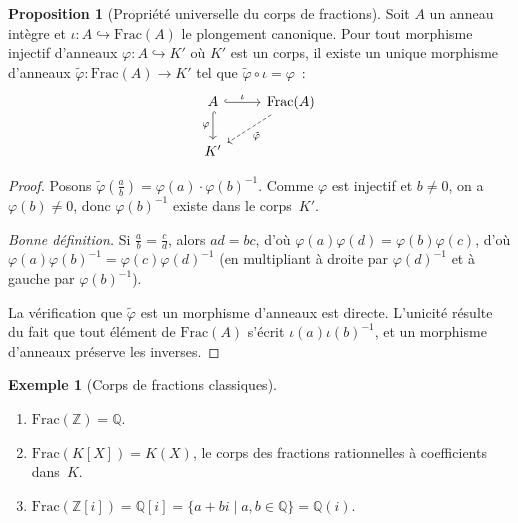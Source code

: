 \documentclass[12pt,a4paper,openany]{book}
\theoremstyle{definition}
\newtheorem{proposition}{Proposition}[chapter]
\newtheorem{exemple}{Exemple}[chapter]
\newcommand{\Z}{\mathbb{Z}}
\newcommand{\Q}{\mathbb{Q}}
\begin{document}
\begin{proposition}[Propriété universelle du corps de fractions]%
\label{prop:prop-univ-fractions}
Soit $A$ un anneau intègre et $\iota \colon A \hookrightarrow
\mathrm{Frac}(A)$ le plongement canonique. Pour tout morphisme
injectif d'anneaux $\varphi \colon A \hookrightarrow K'$ où $K'$ est
un corps, il existe un unique morphisme d'anneaux
$\tilde{\varphi} \colon \mathrm{Frac}(A) \to K'$ tel que
$\tilde{\varphi} \circ \iota = \varphi$~:
\[
\begin{tikzcd}
  A \arrow[r, hook, "\iota"] \arrow[d, hook, "\varphi"'] &
  \mathrm{Frac}(A) \arrow[dl, dashed, "\tilde{\varphi}"] \\
  K'
\end{tikzcd}
\]
\end{proposition}

\begin{proof}
Posons $\tilde{\varphi}\!\left(\frac{a}{b}\right) =
\varphi(a) \cdot \varphi(b)^{-1}$. Comme $\varphi$ est injectif et
$b \neq 0$, on a $\varphi(b) \neq 0$, donc $\varphi(b)^{-1}$ existe
dans le corps~$K'$.

\emph{Bonne définition.} Si $\frac{a}{b} = \frac{c}{d}$, alors
$ad = bc$, d'où $\varphi(a)\varphi(d) = \varphi(b)\varphi(c)$, d'où
$\varphi(a)\varphi(b)^{-1} = \varphi(c)\varphi(d)^{-1}$ (en multipliant
à droite par $\varphi(d)^{-1}$ et à gauche par $\varphi(b)^{-1}$).

La vérification que $\tilde{\varphi}$ est un morphisme d'anneaux est
directe. L'unicité résulte du fait que tout élément de $\mathrm{Frac}(A)$
s'écrit $\iota(a)\iota(b)^{-1}$, et un morphisme d'anneaux préserve les
inverses.
\end{proof}

\begin{exemple}[Corps de fractions classiques]\label{ex:corps-fractions}
\begin{enumerate}[label=\textup{(\alph*)}]
  \item $\mathrm{Frac}(\Z) = \Q$.
  \item $\mathrm{Frac}(K[X]) = K(X)$, le corps des
        fractions rationnelles à coefficients dans~$K$.
  \item $\mathrm{Frac}(\Z[i]) = \Q[i] = \{a + bi \mid a, b \in \Q\}
         = \Q(i)$.
\end{enumerate}
\end{exemple}

\end{document}
